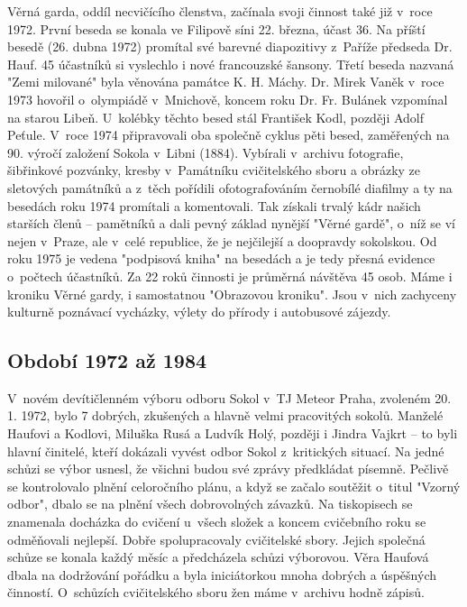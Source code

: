 \documentclass[a5paper, 11pt, twoside]{article}
\begin{document}
Věrná garda, oddíl necvičícího členstva, začínala svoji činnost také již
v~roce 1972. První beseda se konala ve Filipově síni 22. března, účast
36. Na příští besedě (26. dubna 1972) promítal své barevné diapozitivy
z~Paříže předseda Dr. Hauf. 45 účastníků si vyslechlo i nové francouzské
šansony. Třetí beseda nazvaná "Zemi milované" byla věnována památce K.
H. Máchy. Dr. Mirek Vaněk v~roce 1973 hovořil o~olympiádě v~Mnichově,
koncem roku Dr. Fr. Bulánek vzpomínal na starou Libeň. U~kolébky těchto
besed stál František Kodl, později Adolf Peťule. V~roce 1974
připravovali oba společně cyklus pěti besed, zaměřených na 90. výročí
založení Sokola v~Libni (1884). Vybírali v~archivu fotografie,
šibřinkové pozvánky, kresby v~Památníku cvičitelského sboru a obrázky ze
sletových památníků a z~těch pořídili ofotografováním černobílé diafilmy
a ty na besedách roku 1974 promítali a komentovali. Tak získali trvalý
kádr našich starších členů -- pamětníků a dali pevný základ nynější
"Věrné gardě", o~níž se ví nejen v~Praze, ale v~celé republice, že je
nejčilejší a doopravdy sokolskou. Od roku 1975 je vedena "podpisová
kniha" na besedách a je tedy přesná evidence o~počtech účastníků. Za 22
roků činnosti je průměrná návštěva 45 osob. Máme i kroniku Věrné gardy,
i samostatnou "Obrazovou kroniku". Jsou v~nich zachyceny kulturně
poznávací vycházky, výlety do přírody i autobusové zájezdy.

\subsection{Období 1972 až 1984}

V~novém devítičlenném výboru odboru Sokol v~TJ Meteor Praha, zvoleném
20. 1. 1972, bylo 7 dobrých, zkušených a hlavně velmi pracovitých
sokolů. Manželé Haufovi a Kodlovi, Miluška Rusá a Ludvík Holý, později i
Jindra Vajkrt -- to byli hlavní činitelé, kteří dokázali vyvést odbor
Sokol z~kritických situací. Na jedné schůzi se výbor usnesl, že všichni
budou své zprávy předkládat písemně. Pečlivě se kontrolovalo plnění
celoročního plánu, a když se začalo soutěžit o~titul "Vzorný odbor",
dbalo se na plnění všech dobrovolných závazků. Na tiskopisech se
znamenala docházka do cvičení u~všech složek a koncem cvičebního roku se
odměňovali nejlepší. Dobře spolupracovaly cvičitelské sbory. Jejich
společná schůze se konala každý měsíc a předcházela schůzi výborovou.
Věra Haufová dbala na dodržování pořádku a byla iniciátorkou mnoha
dobrých a úspěšných činností. O~schůzích cvičitelského sboru žen máme
v~archivu hodně zápisů.
\end{document}
